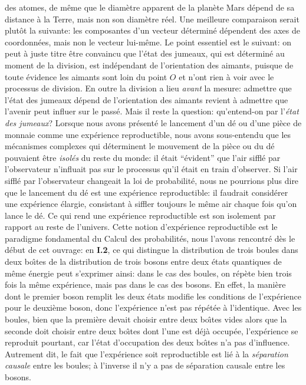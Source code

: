 des atomes, de m\^eme que le diam\`etre apparent de la plan\`ete Mars 
d\'epend de sa distance \`a la Terre, mais non son diam\`etre r\'eel.  
Une meilleure comparaison serait plut\^ot la suivante: les composantes 
d'un vecteur d\'etermin\'e d\'ependent des axes de coordonn\'ees, mais  
non le vecteur lui-m\^eme.  
\medskip 
Le point essentiel est le suivant: on peut \`a juste titre \^etre convaincu 
que l'\'etat des jumeaux, qui est d\'etermin\'e au moment de la division, 
est ind\'ependant de l'orientation des aimants,  puisque de toute 
\'evidence les aimants sont loin du point $O$ et n'ont rien \`a voir avec  
le processus de division. En outre la division a lieu {\it avant} la mesure: 
admettre que l'\'etat des jumeaux d\'epend de l'orientation des aimants  
revient \`a admettre que l'avenir peut influer sur le pass\'e. 
\medskip 
Mais il reste la question: qu'entend-on par l'{\it \'etat des jumeaux}? 
Lorsque nous avons pr\'esent\'e le lancement d'un d\'e ou d'une pi\`ece de 
monnaie comme une exp\'erience reproductible, nous avons sous-entendu 
que les m\'ecanismes complexes qui d\'eterminent le mouvement de la 
pi\`ece ou du d\'e pouvaient \^etre {\it isol\'es} du reste du monde: il 
\'etait ``\'evident'' que l'air siffl\'e par l'observateur n'influait pas
sur le processus qu'il \'etait en train d'observer. Si l'air siffl\'e par  
l'observateur  changeait la loi de probabilit\'e, nous ne pourrions plus  
dire que le lancement du d\'e est une exp\'erience  reproductible: il 
faudrait consid\'erer une exp\'erience \'elargie, consistant \`a siffler 
toujours le m\^eme air chaque fois qu'on lance le d\'e.  
Ce qui rend une exp\'erience reproductible est son isolement par rapport  
au reste de l'univers. Cette notion d'exp\'erience reproductible  est le 
paradigme fondamental du Calcul des probabilit\'es, nous l'avons 
rencontr\'e d\`es le d\'ebut de cet ouvrage: en {\bf I.2}, ce qui distingue  
la distribution de trois boules  dans deux bo\^\i tes de la distribution  
de trois bosons entre deux \'etats quantiques de m\^eme \'energie peut 
s'exprimer ainsi: dans le cas des boules, on r\'ep\`ete bien trois fois la 
m\^eme exp\'erience, mais pas  dans le cas des bosons.  En effet, la 
mani\`ere  dont le premier boson remplit les deux \'etats modifie les 
conditions de l'exp\'erience pour  le deuxi\`eme boson, donc  
l'exp\'erience n'est pas r\'ep\'et\'ee \`a  l'identique. Avec les boules,  
bien que la premi\`ere  devait choisir entre deux bo\^\i tes vides alors  
que la seconde doit  choisir  entre deux bo\^\i tes dont l'une est d\'ej\`a 
occup\'ee, l'exp\'erience  se reproduit pourtant, car l'\'etat d'occupation 
des deux  bo\^\i tes n'a pas d'influence. Autrement dit, le fait que  
l'exp\'erience soit  reproductible est li\'e \`a la {\it s\'eparation  
causale} entre les boules;  \`a l'inverse il n'y a pas de s\'eparation  
causale entre les bosons.     
 
